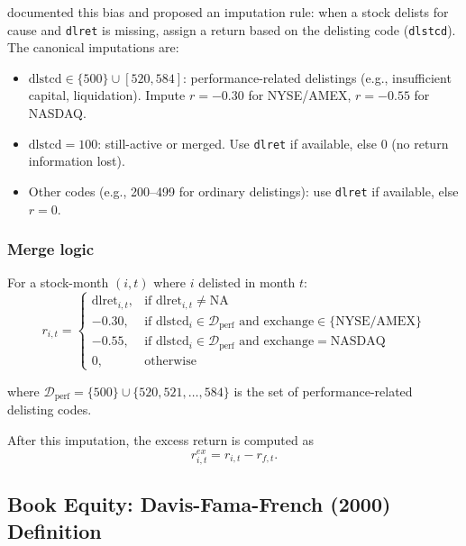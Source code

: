 \cite{Shumway1997} documented this bias and proposed an imputation
rule: when a stock delists for cause and \texttt{dlret} is missing,
assign a return based on the delisting code (\texttt{dlstcd}). The
canonical imputations are:

\begin{itemize}
\item \(\mathrm{dlstcd} \in \{500\} \cup [520, 584]\): performance-related
      delistings (e.g., insufficient capital, liquidation). Impute
      \(r = -0.30\) for NYSE/AMEX, \(r = -0.55\) for NASDAQ.
\item \(\mathrm{dlstcd} = 100\): still-active or merged. Use
      \texttt{dlret} if available, else 0 (no return information lost).
\item Other codes (e.g., 200--499 for ordinary delistings): use
      \texttt{dlret} if available, else \(r = 0\).
\end{itemize}

\subsubsection{Merge logic}

For a stock-month \((i, t)\) where \(i\) delisted in month \(t\):
\begin{equation}
r_{i,t} =
\begin{cases}
\mathrm{dlret}_{i,t}, & \text{if } \mathrm{dlret}_{i,t} \neq \text{NA} \\
-0.30, & \text{if } \mathrm{dlstcd}_i \in \mathcal{D}_{\text{perf}}
        \text{ and exchange} \in \{\text{NYSE/AMEX}\} \\
-0.55, & \text{if } \mathrm{dlstcd}_i \in \mathcal{D}_{\text{perf}}
        \text{ and exchange} = \text{NASDAQ} \\
0, & \text{otherwise}
\end{cases}
\label{eq:shumway-imputation}
\end{equation}

where \(\mathcal{D}_{\text{perf}} = \{500\} \cup \{520, 521, \ldots, 584\}\)
is the set of performance-related delisting codes.

After this imputation, the excess return is computed as
\begin{equation}
r^{ex}_{i,t} = r_{i,t} - r_{f,t}.
\label{eq:excess-return-defn}
\end{equation}

\subsection{Book Equity: Davis-Fama-French (2000) Definition}
\label{subsec:stage0-be}

